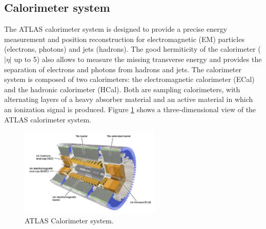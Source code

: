 \subsection{Calorimeter system}
\label{chap2:ATLAS:Calo}
The ATLAS calorimeter system is designed to provide a precise energy measurement and position reconstruction for electromagnetic (EM) particles (electrons, photons) and jets (hadrons). The good hermiticity of the calorimeter ($|\eta|$ up to 5) also allows to measure the missing transverse energy and provides the separation of electrons and photons from hadrons and jets. The calorimeter system is composed of two calorimeters: the electromagnetic calorimeter (ECal) and the hadronic calorimeter (HCal). Both are sampling calorimeters, with alternating layers of a heavy absorber material and an active material in which an ionization signal is produced. Figure \ref{fig:chap2:ATLAS:Calo} shows a three-dimensional view of the ATLAS calorimeter system.
\begin{figure}[htbp]
    \centering
    \includegraphics[width=0.6\textwidth]{Ch2/Img/Calo.png}
    \caption{ATLAS Calorimeter system.}
    \label{fig:chap2:ATLAS:Calo}
\end{figure}

